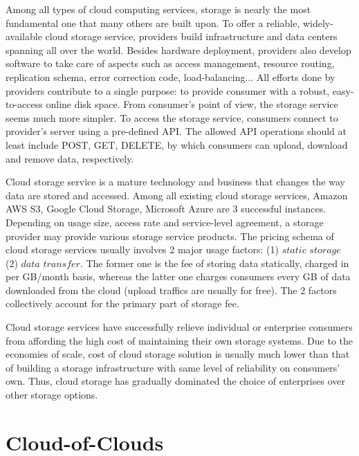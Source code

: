 Among all types of cloud computing services, storage is nearly the most fundamental one that many others are built upon. To offer a reliable, widely-available cloud storage service, providers build infrastructure and data centers spanning all over the world. Besides hardware deployment, providers also develop software to take care of aspects such as access management, resource routing, replication schema, error correction code, load-balancing... All efforts done by providers contribute to a single purpose: to provide consumer with a robust, easy-to-access online disk space. From consumer's point of view, the storage service seems much more simpler. To access the storage service, consumers connect to provider's server using a pre-defined API. The allowed API operations should at least include POST, GET, DELETE, by which consumers can upload, download and remove data, respectively.

Cloud storage service is a mature technology and business that changes the way data are stored and accessed. Among all existing cloud storage services, Amazon AWS S3\cite{awss3}, Google Cloud Storage\cite{googlecloudstorage}, Microsoft Azure\cite{msazurestorage} are 3 successful instances. Depending on usage size, access rate and service-level agreement, a storage provider may provide various storage service products. The pricing schema of cloud storage services usually involves 2 major usage factors: (1) $static$ $storage$ (2) $data$ $transfer$. The former one is the fee of storing data statically, charged in per GB/month basis, whereas the latter one charges consumers every GB of data downloaded from the cloud (upload traffics are usually for free). The 2 factors collectively account for the primary part of storage fee.

Cloud storage services have successfully relieve individual or enterprise consumers from affording the high cost of maintaining their own storage systems. Due to the economies of scale, cost of cloud storage solution is usually much lower than that of building a storage infrastructure with same level of reliability on consumers' own. Thus, cloud storage has gradually dominated the choice of enterprises over other storage options\cite{storagetrends2018}.

\newpage

\section{Cloud-of-Clouds}
\label{s:cloudofclouds}


